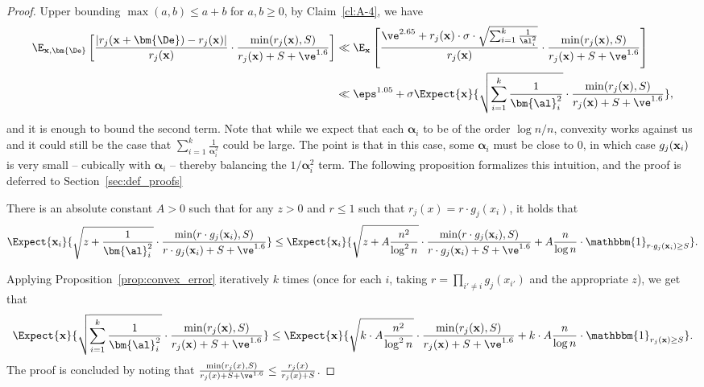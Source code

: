 \begin{proof}
	Upper bounding $\max(a,b)\leq a+b$ for $a,b\geq 0$, by Claim~\ref{cl:A-4}, we have
	\begin{align*}
	\E_{{\bf x},\bm{\De}} \left[ \frac{|r_j({\bf x}+\bm{\De})-r_j({\bf x})|}{r_j({\bf x})}\cdot \frac{\min(r_j({\bf x}),S)}
	{r_j({\bf x})+S+\ve^{1.6}}\right]
    &\ll \E_{{\bf x}}
	\left[ \frac{\ve^{2.65}+r_j({\bf x})\cdot \sigma\cdot\sqrt{\sum_{i=1}^k \frac{1}{\al_i^2}}}{r_j({\bf x})}\cdot \frac{\min(r_j({\bf x}),S)}
	{r_j({\bf x})+S+\ve^{1.6}}\right]\\
    &\ll  \eps^{1.05}+\sigma\Expect{{\bf x}}{\sqrt{\sum_{i=1}^k \frac{1}{\bm{\al}_i^2}}\cdot \frac{\min(r_j({\bf x}),S)}{r_j({\bf x})+S+\ve^{1.6}}},
    \end{align*}
    and it is enough to bound the second term. Note that while we expect that each $\bm{\alpha}_i$ to be of the order $\log n/n$, convexity works against
    us and it could still be the case that $\sum\limits_{i=1}^{k}\frac{1}{\bm{\alpha}_i^2}$ could be large.
    The point is that in this case, some $\bm{\alpha}_i$ must be close to $0$, in which case $g_j({\bf x}_i)$ is very small
    -- cubically with $\bm{\alpha}_i$ -- thereby balancing the $1/\bm{\alpha}_i^2$ term. The following proposition formalizes this intuition,
    and the proof is deferred to Section~\ref{sec:def_proofs}
    \begin{proposition}\label{prop:convex_error}
      There is an absolute constant $A>0$ such that for any $z>0$ and $r\leq 1$ such that $r_j(x) = r\cdot g_j(x_i)$,
      it holds that
      \begin{equation*}
	\Expect{{\bf x}_i}{\sqrt{z+\frac{1}{\bm{\al}_i^2}} \cdot\frac{\min(r\cdot g_j({\bf x}_i),S)}
	{r\cdot g_j({\bf x}_i)+S+\ve^{1.6}}}
    \leq
	\Expect{{\bf x}_i}{\sqrt{z+A\frac{n^2}{\log^2 n}} \cdot \frac{\min(r\cdot g_j({\bf x}_i),S)}{r\cdot g_j({\bf x}_i)+S+\ve^{1.6}} +A\frac{n}{\log n} \cdot
\mathbbm{1}_{r\cdot g_j({\bf x}_i)\ge S}}.
	\end{equation*}
    \end{proposition}

    Applying Proposition~\ref{prop:convex_error} iteratively $k$ times (once for each $i$, taking $r = \prod\limits_{i'\neq i}{g_{j}(x_{i'})}$
    and the appropriate $z$), we get that
    \[
    \Expect{{\bf x}}{\sqrt{\sum_{i=1}^k \frac{1}{\bm{\al}_i^2}}\cdot \frac{\min(r_j({\bf x}),S)}{r_j({\bf x})+S+\ve^{1.6}}}
    \leq \Expect{{\bf x}}{\sqrt{k\cdot A\frac{n^2}{\log^2 n}}\cdot \frac{\min(r_j({\bf x}),S)}{r_j({\bf x})+S+\ve^{1.6}}+k\cdot A\frac{n}{\log n} \cdot
    \mathbbm{1}_{r_j({\bf x})\geq S}}.
    \]
    The proof is concluded by noting that $\frac{\min(r_j(x),S)}{r_j(x)+S+\ve^{1.6}}\leq \frac{r_j(x)}{r_j(x)+S}$.
    \end{proof}


